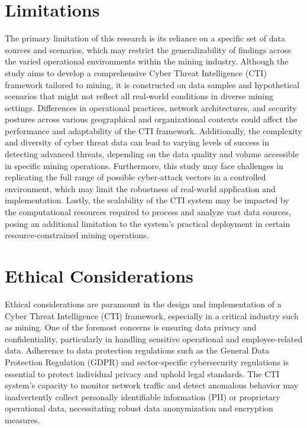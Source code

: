 \documentclass[a4paper,twoside,12pt]{report}
\begin{document}
\section{Limitations}

The primary limitation of this research is its reliance on a specific set of data sources and scenarios, which may restrict the generalizability of findings across the varied operational environments within the mining industry. Although the study aims to develop a comprehensive Cyber Threat Intelligence (CTI) framework tailored to mining, it is constructed on data samples and hypothetical scenarios that might not reflect all real-world conditions in diverse mining settings. Differences in operational practices, network architectures, and security postures across various geographical and organizational contexts could affect the performance and adaptability of the CTI framework. Additionally, the complexity and diversity of cyber threat data can lead to varying levels of success in detecting advanced threats, depending on the data quality and volume accessible in specific mining operations. Furthermore, this study may face challenges in replicating the full range of possible cyber-attack vectors in a controlled environment, which may limit the robustness of real-world application and implementation. Lastly, the scalability of the CTI system may be impacted by the computational resources required to process and analyze vast data sources, posing an additional limitation to the system’s practical deployment in certain resource-constrained mining operations.

\section{Ethical Considerations}

Ethical considerations are paramount in the design and implementation of a Cyber Threat Intelligence (CTI) framework, especially in a critical industry such as mining. One of the foremost concerns is ensuring data privacy and confidentiality, particularly in handling sensitive operational and employee-related data. Adherence to data protection regulations such as the General Data Protection Regulation (GDPR) and sector-specific cybersecurity regulations is essential to protect individual privacy and uphold legal standards. The CTI system’s capacity to monitor network traffic and detect anomalous behavior may inadvertently collect personally identifiable information (PII) or proprietary operational data, necessitating robust data anonymization and encryption measures.
\end{document}
